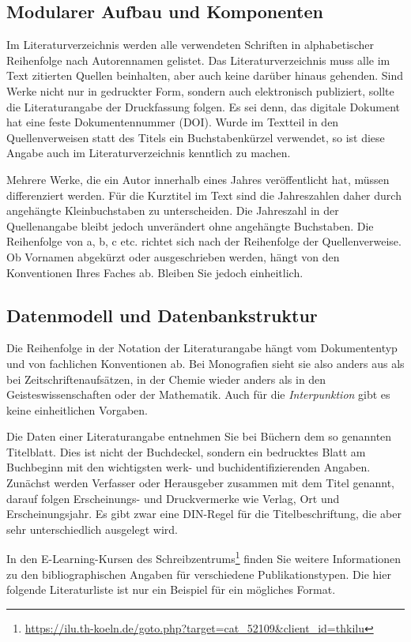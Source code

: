 \subsection{Modularer Aufbau und Komponenten}
\label{sec:bib-content}
Im Literaturverzeichnis werden alle verwendeten Schriften in alphabetischer Reihenfolge nach Autorennamen gelistet. Das Literaturverzeichnis muss alle im Text zitierten Quellen beinhalten, aber auch keine darüber hinaus gehenden. Sind Werke nicht nur in gedruckter Form, sondern auch elektronisch publiziert, sollte die Literaturangabe der Druckfassung folgen. Es sei denn, das digitale Dokument hat eine feste Dokumentennummer (DOI). Wurde im Textteil in den Quellenverweisen statt des Titels ein Buchstabenkürzel verwendet, so ist diese Angabe auch im Literaturverzeichnis kenntlich zu machen.
\par
Mehrere Werke, die ein Autor innerhalb eines Jahres veröffentlicht hat, müssen differenziert werden. Für die Kurztitel im Text sind die Jahreszahlen daher durch angehängte Kleinbuchstaben zu unterscheiden. Die Jahreszahl in der Quellenangabe bleibt jedoch unverändert ohne angehängte Buchstaben. Die Reihenfolge von a, b, c etc. richtet sich nach der Reihenfolge der Quellenverweise. Ob Vornamen abgekürzt oder ausgeschrieben werden, hängt von den Konventionen Ihres Faches ab. Bleiben Sie jedoch einheitlich.
%
\subsection{Datenmodell und Datenbankstruktur}
Die Reihenfolge in der Notation der Literaturangabe hängt vom Dokumententyp und von fachlichen Konventionen ab. Bei Monografien sieht sie also anders aus als bei Zeitschriftenaufsätzen, in der Chemie wieder anders als in den Geisteswissenschaften oder der Mathematik. Auch für die \emph{Interpunktion} gibt es keine einheitlichen Vorgaben.
\par
Die Daten einer Literaturangabe entnehmen Sie bei Büchern dem so genannten Titelblatt. Dies ist nicht der Buchdeckel, sondern ein bedrucktes Blatt am Buchbeginn mit den wichtigsten werk- und buchidentifizierenden Angaben. Zunächst werden Verfasser oder Herausgeber zusammen mit dem Titel genannt, darauf folgen Erscheinungs- und Druckvermerke wie Verlag, Ort und Erscheinungsjahr. Es gibt zwar eine DIN-Regel für die Titelbeschriftung, die aber sehr unterschiedlich ausgelegt wird.
\par
In den E-Learning-Kursen des Schreibzentrums\footnote{\href{https://ilu.th-koeln.de/goto.php?target=cat\_52109\&client\_id=thkilu}{https://ilu.th-koeln.de/goto.php?target=cat\_52109\&client\_id=thkilu}} finden Sie weitere Informationen zu den bibliographischen Angaben für verschiedene Publikationstypen. Die hier folgende Literaturliste ist nur ein Beispiel für ein mögliches Format.

